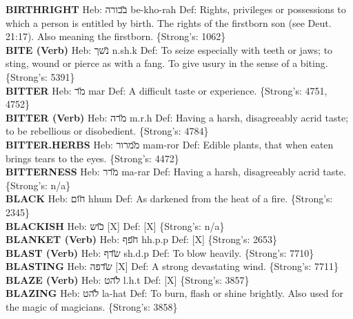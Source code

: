 {\textbf{BIRTHRIGHT} Heb: {\large\H בכורה} be-kho-rah Def: Rights, privileges or possessions to which a person is entitled by birth. The rights of the firstborn son (see Deut. 21:17). Also meaning the firstborn. \{Strong's: 1062\}\hfill{}\\

\textbf{BITE (Verb)} Heb: {\large\H נשך} n.sh.k Def: To seize especially with teeth or jaws; to sting, wound or pierce as with a fang. To give usury in the sense of a biting. \{Strong's: 5391\}\hfill{}\\

\textbf{BITTER} Heb: {\large\H מר} mar Def: A difficult taste or experience. \{Strong's: 4751, 4752\}\hfill{}\\

\textbf{BITTER (Verb)} Heb: {\large\H מרה} m.r.h Def: Having a harsh, disagreeably acrid taste; to be rebellious or disobedient. \{Strong's: 4784\}\hfill{}\\

\textbf{BITTER.HERBS} Heb: {\large\H ממרור} mam-ror Def: Edible plants, that when eaten brings tears to the eyes. \{Strong's: 4472\}\hfill{}\\

\textbf{BITTERNESS} Heb: {\large\H מרר} ma-rar Def: Having a harsh, disagreeably acrid taste. \{Strong's: n/a\}\hfill{}\\

\textbf{BLACK} Heb: {\large\H חום} hhum Def: As darkened from the heat of a fire. \{Strong's: 2345\}\hfill{}\\

\textbf{BLACKISH} Heb: {\large\H כוש} {[}X{]} Def: {[}X{]} \{Strong's: n/a\}\hfill{}\\

\textbf{BLANKET (Verb)} Heb: {\large\H חפף} hh.p.p Def: {[}X{]} \{Strong's: 2653\}\hfill{}\\

\textbf{BLAST (Verb)} Heb: {\large\H שדף} sh.d.p Def: To blow heavily. \{Strong's: 7710\}\hfill{}\\

\textbf{BLASTING} Heb: {\large\H שדפה} {[}X{]} Def: A strong devastating wind. \{Strong's: 7711\}\hfill{}\\

\textbf{BLAZE (Verb)} Heb: {\large\H להט} l.h.t Def: {[}X{]} \{Strong's: 3857\}\hfill{}\\

\textbf{BLAZING} Heb: {\large\H להט} la-hat Def: To burn, flash or shine brightly. Also used for the magic of magicians. \{Strong's: 3858\}\hfill{}\\

}
